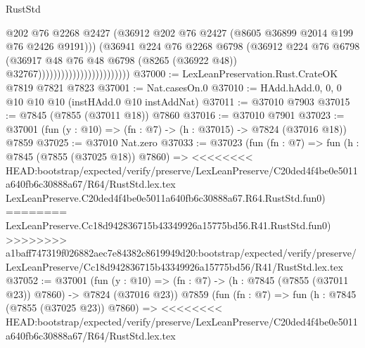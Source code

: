 \begin{lexlean}{RustStd}
\begin{coremodule}
{\begin{coremodule}
{{{{{{{{{{{{{{{{{{{{{{{{{{{{{{{{{{{{{{{{{{{{{{{{{{{{{{                                                @202
                                                @76
                                                @2268
                                                @2427
                                                (@36912
                                                  @202
                                                  @76
                                                  @2427
                                                  (@8605 @36899 @2014 @199 @76 @2426 @9191)))
                                              (@36941
                                                @224
                                                @76
                                                @2268
                                                @6798
                                                (@36912
                                                  @224
                                                  @76
                                                  @6798
                                                  (@36917
                                                    @48
                                                    @76
                                                    @48
                                                    @6798
                                                    (@8265 (@36922 @48))
                                                    @32767))))))))))))))))))))))))
@37000 := LexLeanPreservation.Rust.CrateOK @7819 @7821 @7823
@37001 := Nat.casesOn.{0}
@37010 := HAdd.hAdd.{0, 0, 0} @10 @10 @10 (instHAdd.{0} @10 instAddNat)
@37011 := @37010 @7903
@37015 := @7845 (@7855 (@37011 @18)) @7860
@37016 := @37010 @7901
@37023 := @37001 (fun (y : @10) => (fn : @7) -> (h : @37015) -> @7824 (@37016 @18)) @7859
@37025 := @37010 Nat.zero
@37033 := @37023
    (fun (fn : @7) =>
    fun (h : @7845 (@7855 (@37025 @18)) @7860) =>
<<<<<<<< HEAD:bootstrap/expected/verify/preserve/LexLeanPreserve/C20ded4f4be0e5011a640fb6c30888a67/R64/RustStd.lex.tex
    LexLeanPreserve.C20ded4f4be0e5011a640fb6c30888a67.R64.RustStd.fun0)
========
    LexLeanPreserve.Cc18d942836715b43349926a15775bd56.R41.RustStd.fun0)
>>>>>>>> a1baff747319f026882aec7e84382c8619949d20:bootstrap/expected/verify/preserve/LexLeanPreserve/Cc18d942836715b43349926a15775bd56/R41/RustStd.lex.tex
@37052 := @37001
    (fun (y : @10) => (fn : @7) -> (h : @7845 (@7855 (@37011 @23)) @7860) -> @7824 (@37016 @23))
    @7859
    (fun (fn : @7) =>
    fun (h : @7845 (@7855 (@37025 @23)) @7860) =>
<<<<<<<< HEAD:bootstrap/expected/verify/preserve/LexLeanPreserve/C20ded4f4be0e5011a640fb6c30888a67/R64/RustStd.lex.tex
}}}}}}}}}}}}}}}}}}}}}}}}}}}}}}}}}}}}}}}}}}}}}}}}}}}}}}
\end{coremodule}}
\end{coremodule}
\end{lexlean}
